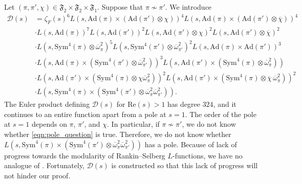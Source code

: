 \documentclass[11pt]{amsart}
\theoremstyle{remark}
\numberwithin{equation}{section}
\begin{document}
Let $(\pi,\pi',\chi)\in\mathfrak{F}_2\times\mathfrak{F}_2\times\mathfrak{F}_1$.  Suppose that $\pi\not\sim\pi'$.  We introduce
\begin{equation}
\label{eqn:D_Maass}
\begin{aligned}
\mathcal{D}(s)&=\zeta_F(s)^6 L(s,\mathrm{Ad}(\pi)\times(\mathrm{Ad}(\pi')\otimes\chi))^4 L(s,\mathrm{Ad}(\pi)\times(\mathrm{Ad}(\pi')\otimes\overline{\chi}))^4\\
&\cdot L(s,\mathrm{Ad}(\pi))^7 L(s,\mathrm{Ad}(\pi'))^2 L(s,\mathrm{Ad}(\pi')\otimes\chi)^2 L(s,\mathrm{Ad}(\pi')\otimes\overline{\chi})^2\\
&\cdot L(s,\mathrm{Sym}^4(\pi)\otimes\overline{\omega}_{\pi}^{2})^5 L(s,\mathrm{Sym}^4(\pi')\otimes\overline{\omega}_{\pi'}^{2})^2 L(s,\mathrm{Ad}(\pi)\times\mathrm{Ad}(\pi'))^3\\
&\cdot L(s,\mathrm{Ad}(\pi)\times(\mathrm{Sym}^4(\pi')\otimes\overline{\omega}_{\pi'}^{2}))^3 L(s,\mathrm{Ad}(\pi')\times(\mathrm{Sym}^4(\pi)\otimes\overline{\omega}_{\pi}^{2}))\\
&\cdot L(s,\mathrm{Ad}(\pi')\times(\mathrm{Sym}^4(\pi)\otimes\chi \overline{\omega}_{\pi}^{2}))^2 L(s,\mathrm{Ad}(\pi')\times(\mathrm{Sym}^4(\pi)\otimes\overline{\chi}\,\overline{\omega}_{\pi}^{2}))^2 \\
&\cdot  L(s,\mathrm{Sym}^4(\pi)\times(\mathrm{Sym}^4(\pi')\otimes\overline{\omega}_{\pi}^{2} \overline{\omega}_{\pi'}^{2})).
\end{aligned}
\end{equation}
The Euler product defining $\mathcal{D}(s)$ for $\mathrm{Re}(s)>1$ has degree $324$, and it continues to an entire function apart from a pole at $s=1$.  The order of the pole at $s=1$ depends on $\pi$, $\pi'$, and $\chi$.  In particular, if $\pi\not\sim\pi'$, we do not know whether \eqref{eqn:pole_question} is true.  Therefore, we do not know whether $L(s,\mathrm{Sym}^4(\pi)\times(\mathrm{Sym}^4(\pi')\otimes\overline{\omega}_{\pi}^2\overline{\omega}_{\pi'}^2))$ has a pole.  Because of lack of progress towards the modularity of Rankin--Selberg $L$-functions, we have no analogue of \cite[Theorem 4.1.2]{Ramakrishnan2}.  Fortunately, $\mathcal{D}(s)$ is constructed so that this lack of progress will not hinder our proof.
\end{document}
